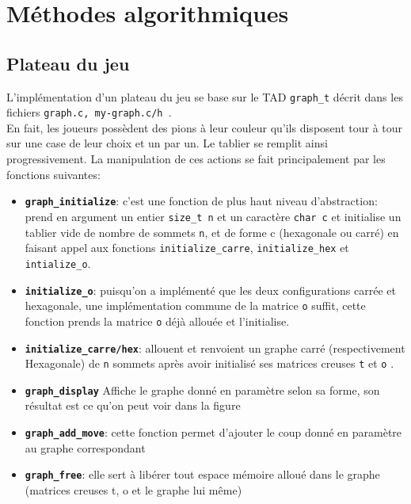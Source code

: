 \documentclass[a4paper,10pt]{article}
\begin{document}
\section{Méthodes algorithmiques}
\subsection{Plateau du jeu}
L'implémentation d'un plateau du jeu se base sur le TAD \texttt{graph\_t} décrit dans les fichiers \texttt{graph.c, my-graph.c/h }.\\
En fait, les joueurs possèdent des pions à leur couleur qu'ils disposent tour à tour sur une case de leur choix et un par un. Le tablier se remplit ainsi progressivement. La manipulation de ces actions se fait principalement par les fonctions suivantes: 
\begin{itemize}
    \item \textbf{\texttt{graph\_initialize}}: c'est une fonction de plus haut niveau d’abstraction: prend en argument un entier \texttt{size\_t n} et un caractère \texttt{char c} et initialise un tablier vide de nombre de sommets \texttt{n}, et de forme c (hexagonale ou carré) en faisant appel aux fonctions \texttt{initialize\_carre}, \texttt{initialize\_hex} et \texttt{intialize\_o}.
    \newline
    \item \textbf{\texttt{initialize\_o}}: puisqu'on a implémenté que les deux configurations carrée et hexagonale, une implémentation commune de la matrice \texttt{o}  suffit, cette fonction prends la matrice \texttt{o} déjà allouée et l'initialise.
    \newline
    \item \textbf{\texttt{initialize\_carre/hex}}: allouent et renvoient un graphe carré (respectivement Hexagonale) de \texttt{n}  sommets après avoir initialisé ses matrices creuses \texttt{t}  et \texttt{o} .
    \newline
    \item \textbf{\texttt{graph\_display}} Affiche le graphe donné en paramètre selon sa forme, son résultat est ce qu’on peut voir dans la figure
    \newline
    \item \textbf{\texttt{graph\_add\_move}}: cette fonction permet d'ajouter le coup donné en paramètre au graphe correspondant
    \newline
    \item \textbf{\texttt{graph\_free}}: elle sert à libérer tout espace mémoire alloué dans le graphe (matrices creuses t, o et le graphe lui même)
\end{itemize}
\end{document}
